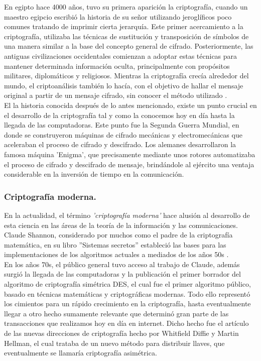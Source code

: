 \documentclass[12pt, a4paper, titlepage]{report}
\begin{document}
                En egipto hace 4000 años, tuvo su primera aparición la criptografía, cuando un maestro egipcio escribió la historia de su señor utilizando jeroglíficos poco comunes tratando de imprimir cierta jerarquía. Este primer acercamiento a la criptografía, utilizaba las técnicas de sustitución y transposición de símbolos de una manera similar a la base del concepto general de cifrado. Posteriormente, las antiguas civilizaciones occidentales comienzan a adoptar estas técnicas para mantener determinada información oculta, principalmente con propósitos militares, diplomáticos y religiosos. Mientras la criptografía crecía alrededor del mundo, el criptoanálisis también lo hacía, con el objetivo de hallar el mensaje original a partir de un mensaje cifrado, sin conocer el método utilizado \cite{refSandra} \cite{refCriptografia}.\\
                
                El la historia conocida después de lo antes mencionado, existe un punto crucial en el desarrollo de la criptografía tal y como la conocemos hoy en día hasta la llegada de las computadoras. Este punto fue la Segunda Guerra Mundial, en donde se construyeron máquinas de cifrado mecánicas y electromecánicas que aceleraban el proceso de cifrado y descifrado. Los alemanes desarrollaron la famosa máquina 'Enigma', que precisamente mediante unos rotores automatizaba el proceso de cifrado y descifrado de mensaje, brindándole al ejército una ventaja considerable en la inversión de tiempo en la comunicación.
                
            \subsubsection{Criptografía moderna.}
                En la actualidad, el término \textit{'criptografía moderna'} hace alusión al desarrollo de esta ciencia en las áreas de la teoría de la información y las comunicaciones. Claude Shannon, considerado por muchos como el padre de la criptografía matemática, en su libro ''Sistemas secretos'' estableció las bases para las implementaciones de los algoritmos actuales a mediados de los años 50s \cite{refCriptografia}.\\
                En los años 70s, el público general tuvo acceso al trabajo de Claude, además surgió la llegada de las computadoras y la publicación el primer borrador del algoritmo de criptografía simétrica DES, el cual fue el primer algoritmo público, basado en técnicas matemáticas y criptográficas modernas. Todo ello representó los cimientos para un rápido crecimiento en la criptografía, hasta eventualmente llegar a otro hecho sumamente relevante que determinó gran parte de las transacciones que realizamos hoy en día en internet. Dicho hecho fue el artículo de las nuevas direcciones de criptografía hecho por Whitfield Diffie y Martin Hellman, el cual trataba de un nuevo método para distribuir llaves, que eventualmente se llamaría criptografía asimétrica.
                
\end{document}
